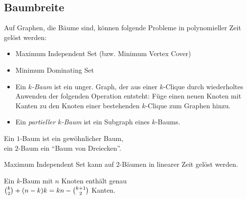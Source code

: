 \documentclass{cheat-sheet}
\begin{document}
\subsection{Baumbreite}

\begin{bem}
  Auf Graphen, die Bäume sind, können folgende Probleme in polynomieller Zeit gelöst werden:
  \begin{itemize}
    \item Maximum Independent Set (bzw. Minimum Vertex Cover)
    \item Minimum Dominating Set
  \end{itemize}
\end{bem}

\begin{defn}
  \begin{itemize}
    \item
      Ein \emph{$k$-Baum} ist ein unger. Graph, der aus einer $k$-Clique durch wiederholtes Anwenden der folgenden Operation entsteht:
      Füge einen neuen Knoten mit Kanten zu den Knoten einer bestehenden $k$-Clique zum Graphen hinzu.
    \item Ein \emph{partieller $k$-Baum} ist ein Subgraph eines $k$-Baums.
  \end{itemize}
\end{defn}

\begin{bspe}
  \begin{minipage}{0.8 \linewidth}
    Ein $1$-Baum ist ein gewöhnlicher Baum, \\
    ein $2$-Baum ein "`Baum von Dreiecken"'.
  \end{minipage}
\end{bspe}

\begin{lem}
  Maximum Independent Set kann auf $2$-Bäumen in linearer Zeit gelöst werden.
\end{lem}

\begin{lem}
  \begin{minipage}[t]{0.8 \linewidth}
    Ein $k$-Baum mit $n$ Knoten enthält genau \\
    $\tbinom{k}{2} + (n-k) k = k n - \tbinom{k+1}{2}$ Kanten.
  \end{minipage}
\end{lem}
\end{document}
